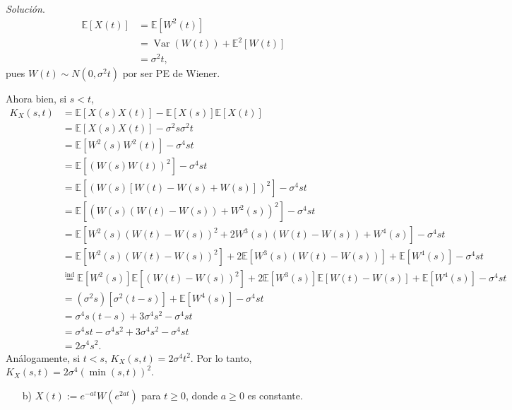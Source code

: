 \documentclass[12pt]{article}
\newcommand{\E}{\mathbb{E}}
\DeclareMathOperator{\Var}{Var}
\begin{document}
\textit{Solución}.
\begin{align*}
    \E[X(t)] &= \E[W^2(t)] \\
    &= \Var(W(t)) + \E^2[W(t)] \\
    &= \sigma^2 t,
\end{align*}
pues $W(t) \sim N(0, \sigma^2t)$ por ser PE de Wiener.

Ahora bien, si $s<t$,
\begin{align*}
    K_X(s,t) &= \E[X(s)X(t)] - \E[X(s)]\E[X(t)] \\
    &= \E[X(s)X(t)] - \sigma^2s \sigma^2t \\
    &= \E[W^2(s)W^2(t)] - \sigma^4st \\
    &= \E[(W(s)W(t))^2] - \sigma^4st \\
    &= \E[(W(s)[W(t)-W(s)+W(s)])^2] - \sigma^4st \\
    &= \E[(W(s)(W(t)-W(s))+W^2(s))^2] - \sigma^4st \\
    &= \E[W^2(s)(W(t)-W(s))^2 + 2W^3(s)(W(t)-W(s)) + W^4(s)] - \sigma^4st \\
    &= \E[W^2(s)(W(t)-W(s))^2] + 2\E[W^3(s)(W(t)-W(s))] + \E[W^4(s)] - \sigma^4st \\
    &\overset{\mathrm{ind}}{=} \E[W^2(s)]\E[(W(t)-W(s))^2] + 2\E[W^3(s)]\E[W(t)-W(s)] + \E[W^4(s)] - \sigma^4st \\
    &= (\sigma^2 s)[\sigma^2(t-s)] + \E[W^4(s)] - \sigma^4st \\
    &= \sigma^4 s(t-s) + 3\sigma^4 s^2 - \sigma^4st \\
    &= \sigma^4 st - \sigma^4s^2 + 3\sigma^4 s^2 - \sigma^4st \\
    &= 2\sigma^4 s^2.
\end{align*}
Análogamente, si $t<s$, $K_X(s,t) = 2\sigma^4 t^2$. Por lo tanto, $K_X(s,t) = 2 \sigma^4 (\min(s,t))^2$.

\begin{tcolorbox}[colback=blue!5!white, colframe=blue!5!white, arc=0mm, boxrule=0pt]      
    \begin{itemize}
        \item[b)] $X(t):= e^{-at}W(e^{2at})$ para $t \geq 0$, donde $a \geq 0$ es constante.
    \end{itemize}
\end{tcolorbox}
\end{document}
